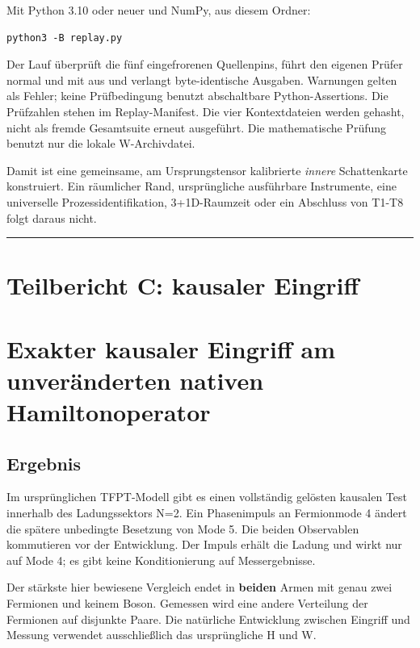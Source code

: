 Mit Python 3.10 oder neuer und NumPy, aus diesem Ordner:

\begin{verbatim}
python3 -B replay.py
\end{verbatim}

Der Lauf überprüft die fünf eingefrorenen Quellenpins, führt den eigenen
Prüfer normal und mit  aus und verlangt byte-identische
Ausgaben. Warnungen gelten als Fehler; keine Prüfbedingung benutzt
abschaltbare Python-Assertions. Die Prüfzahlen stehen im
Replay-Manifest. Die vier Kontextdateien werden gehasht, nicht als
fremde Gesamtsuite erneut ausgeführt. Die mathematische Prüfung benutzt
nur die lokale W-Archivdatei.

Damit ist eine gemeinsame, am Ursprungstensor kalibrierte \emph{innere}
Schattenkarte konstruiert. Ein räumlicher Rand, ursprüngliche
ausführbare Instrumente, eine universelle Prozessidentifikation,
3+1D-Raumzeit oder ein Abschluss von T1-T8 folgt daraus nicht.

\begin{center}\rule{0.5\linewidth}{0.5pt}\end{center}

\section{Teilbericht C: kausaler
Eingriff}\label{teilbericht-c-kausaler-eingriff}

\section{Exakter kausaler Eingriff am unveränderten nativen
Hamiltonoperator}\label{exakter-kausaler-eingriff-am-unveruxe4nderten-nativen-hamiltonoperator}

\subsection{Ergebnis}\label{ergebnis-2}

Im ursprünglichen TFPT-Modell gibt es einen vollständig gelösten
kausalen Test innerhalb des Ladungssektors N=2. Ein Phasenimpuls an
Fermionmode 4 ändert die spätere unbedingte Besetzung von Mode 5. Die
beiden Observablen kommutieren vor der Entwicklung. Der Impuls erhält
die Ladung und wirkt nur auf Mode 4; es gibt keine Konditionierung auf
Messergebnisse.

Der stärkste hier bewiesene Vergleich endet in \textbf{beiden} Armen mit
genau zwei Fermionen und keinem Boson. Gemessen wird eine andere
Verteilung der Fermionen auf disjunkte Paare. Die natürliche Entwicklung
zwischen Eingriff und Messung verwendet ausschließlich das ursprüngliche
H und W.

